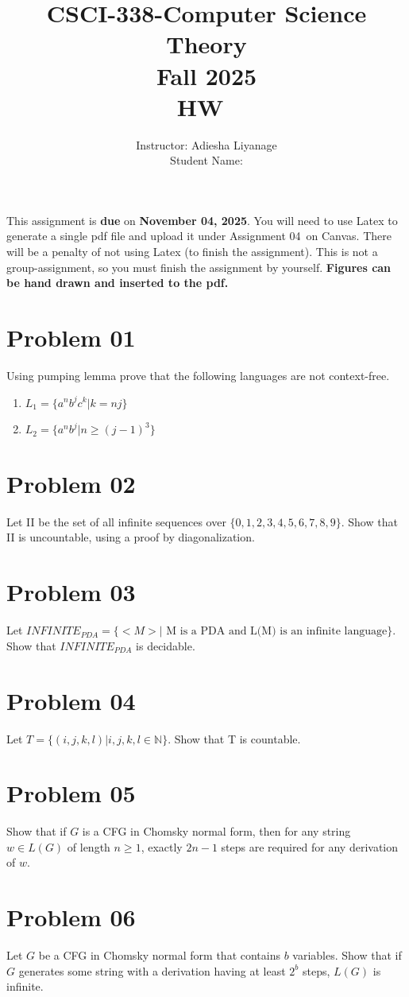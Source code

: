 \documentclass{article}
\title{CSCI-338-Computer Science Theory\\Fall 2025 \\HW~\assignmentnumber}
\author{Instructor: Adiesha Liyanage \\
Student Name: }
\date{}
\newcommand{\assignmentnumber}{04~}
\newcommand{\assignmentduedate}{November 04, 2025}
\begin{document}
\maketitle
This assignment is \textbf{due} on \textbf{\assignmentduedate}. You will need to use Latex to generate a single pdf file and upload it under Assignment \assignmentnumber on Canvas. There will be a penalty of not using Latex (to finish the assignment). This is not a group-assignment, so you must finish the assignment by yourself. \textbf{Figures can be hand drawn and inserted to the pdf.}


\section{Problem 01}
Using pumping lemma prove that the following languages are not context-free.
\begin{enumerate}
    \item \(L_1 = \{a^nb^jc^k | k = nj\}\)
    \item \(L_2 = \{a^nb^j  | n \geq (j - 1)^3\}\)
\end{enumerate}

\section{Problem 02}
Let II be the set of all infinite sequences over \(\{0, 1, 2, 3, 4, 5, 6, 7, 8, 9\}.\) Show that II is uncountable, using a proof by diagonalization.

\section{Problem 03}
Let \(INFINITE_{PDA} = \{<M> | \text{ M is a PDA and L(M) is an infinite language}\}.\)
Show that \(INFINITE_{PDA}\) is decidable.


\section{Problem 04}
Let \(T = \{(i, j, k, l) | i, j, k, l \in \mathbb{N} \}\). Show that T is countable.



\section{Problem 05}
Show that if $G$ is a CFG in Chomsky normal form, then for any string $w \in L(G)$
of length $n \geq 1$, exactly $2n - 1$ steps are required for any derivation of $w$.


\section{Problem 06}
Let $G$ be a CFG in Chomsky normal form that contains $b$ variables. Show that if $G$
generates some string with a derivation having at least $2^b$ steps, $L(G)$ is infinite.
\end{document}
